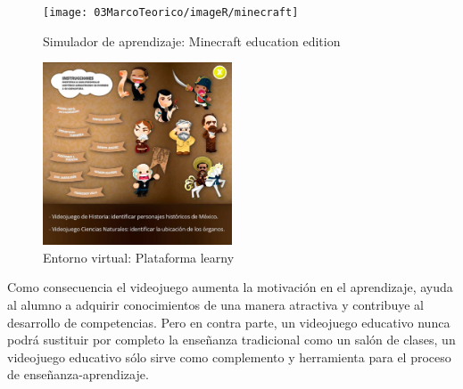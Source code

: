 	\begin{figure}
		\centering
	\caption{Simulador de aprendizaje: Minecraft education edition}
		\label{fig:mine}
		\texttt{[image: 03MarcoTeorico/imageR/minecraft]}
\end{figure}
	\begin{figure}
	\centering
		\caption{Entorno virtual: Plataforma learny}
		\label{fig:lea}
		\includegraphics[width=0.5\textwidth]{03MarcoTeorico/imageR/learny}
\end{figure}

Como consecuencia el videojuego aumenta la motivación en el aprendizaje, ayuda al alumno a adquirir conocimientos de una manera atractiva y contribuye al desarrollo de competencias. Pero en contra parte, un videojuego educativo nunca podrá sustituir por completo la enseñanza tradicional como un salón de clases, un videojuego educativo sólo sirve como complemento y herramienta para el proceso de enseñanza-aprendizaje.
\\[1pt]
